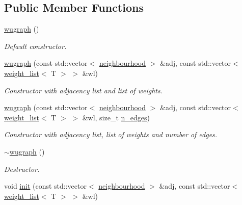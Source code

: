 \subsection*{Public Member Functions}
\begin{DoxyCompactItemize}
\item 
\mbox{\label{classlgraph_1_1wugraph_a3621c2f013cbd5cd4984380aa2aeb842}} 
\hyperlink{classlgraph_1_1wugraph_a3621c2f013cbd5cd4984380aa2aeb842}{wugraph} ()
\begin{DoxyCompactList}\small\item\em Default constructor. \end{DoxyCompactList}\item 
\hyperlink{classlgraph_1_1wugraph_a489f406928d9e982c7fa5b0a3cea53f5}{wugraph} (const std\+::vector$<$ \hyperlink{namespacelgraph_a052e7766c13f3a43cec0aec8173fdede}{neighbourhood} $>$ \&adj, const std\+::vector$<$ \hyperlink{namespacelgraph_a1e0fd5ef0a78b2a92da48adbed265cb6}{weight\+\_\+list}$<$ T $>$ $>$ \&wl)
\begin{DoxyCompactList}\small\item\em Constructor with adjacency list and list of weights. \end{DoxyCompactList}\item 
\hyperlink{classlgraph_1_1wugraph_a958ee0cc05df616aacb077e2effffcf9}{wugraph} (const std\+::vector$<$ \hyperlink{namespacelgraph_a052e7766c13f3a43cec0aec8173fdede}{neighbourhood} $>$ \&adj, const std\+::vector$<$ \hyperlink{namespacelgraph_a1e0fd5ef0a78b2a92da48adbed265cb6}{weight\+\_\+list}$<$ T $>$ $>$ \&wl, size\+\_\+t \hyperlink{classlgraph_1_1xxgraph_af00bce8b07a42754601d1e3bebe2c1fa}{n\+\_\+edges})
\begin{DoxyCompactList}\small\item\em Constructor with adjacency list, list of weights and number of edges. \end{DoxyCompactList}\item 
\mbox{\label{classlgraph_1_1wugraph_abd755d0367bda13250fcccadd1079964}} 
\hyperlink{classlgraph_1_1wugraph_abd755d0367bda13250fcccadd1079964}{$\sim$wugraph} ()
\begin{DoxyCompactList}\small\item\em Destructor. \end{DoxyCompactList}\item 
void \hyperlink{classlgraph_1_1wugraph_adc6e1a1983a2b564349a505e2c8f80c4}{init} (const std\+::vector$<$ \hyperlink{namespacelgraph_a052e7766c13f3a43cec0aec8173fdede}{neighbourhood} $>$ \&adj, const std\+::vector$<$ \hyperlink{namespacelgraph_a1e0fd5ef0a78b2a92da48adbed265cb6}{weight\+\_\+list}$<$ T $>$ $>$ \&wl)

\end{DoxyCompactItemize}
